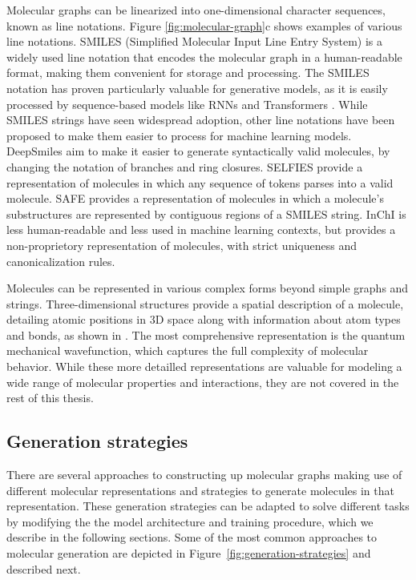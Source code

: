 Molecular graphs can be linearized into one-dimensional character sequences, known as line
notations. Figure \ref{fig:molecular-graph}c shows examples of various line notations. SMILES
(Simplified Molecular Input Line Entry System) \citep{weiningerSMILESChemicalLanguage1988} is a
widely used line notation that encodes the molecular graph in a human-readable format, making them
convenient for storage and processing. The SMILES notation has proven particularly valuable for
generative models, as it is easily processed by sequence-based models like \acp{RNN} and
Transformers \citep{vaswaniAttentionAllYou2017}. While SMILES strings have seen widespread adoption,
other line notations have been proposed to make them easier to process for machine learning
models. DeepSmiles \citep{oboyleDeepSMILESAdaptationSMILES2018} aim to make it easier to generate
syntactically valid molecules, by changing the notation of branches and ring closures. SELFIES
\citep{krennSELFIESFutureMolecular2022} provide a representation of molecules in which any sequence
of tokens parses into a valid molecule. SAFE \citep{noutahiGottaBeSAFE2023} provides a
representation of molecules in which a molecule's substructures are represented by contiguous regions of a
SMILES string. InChI \citep{hellerInChIIUPACInternational2015} is less human-readable and less used
in machine learning contexts, but provides a non-proprietory representation of molecules, with
strict uniqueness and canonicalization rules.

Molecules can be represented in various complex forms beyond simple graphs and strings.
Three-dimensional structures provide a spatial description of a molecule, detailing atomic positions
in 3D space along with information about atom types and bonds, as shown in
. The most comprehensive representation is the quantum mechanical
wavefunction, which captures the full complexity of molecular behavior. While these more
detailled representations are valuable for modeling a wide range of molecular properties and
interactions, they are not covered in the rest of this thesis.

\subsection{Generation strategies}
There are several approaches to constructing up molecular graphs making use of different molecular
representations and strategies to generate molecules in that representation. These generation
strategies can be adapted to solve different tasks by modifying the the model architecture and
training procedure, which we describe in the following sections. Some of the most common approaches
to molecular generation are depicted in Figure~\ref{fig:generation-strategies} and described next.

